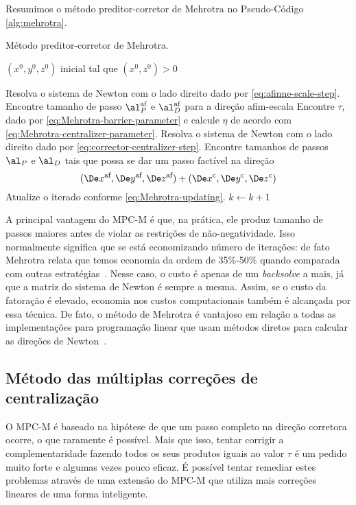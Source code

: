  Resumimos o método preditor-corretor de Mehrotra no Pseudo-Código
 \ref{alg:mehrotra}.
 \begin{algorithm}
\caption{Método preditor-corretor de Mehrotra.}
\label{alg:mehrotra}
\begin{algorithmic}[0] 
\Require $(x^0,y^0,z^0)$ inicial tal que $(x^0,z^0) > 0$ 

	\Repeat
		\State Resolva o sistema de Newton com o lado direito dado por
		\eqref{eq:afinne-scale-step}. 
		 \State Encontre tamanho de passo $\al_P^{\text{af}}$ e $\al_D^{\text{af}}$
		 para a direção afim-escala \State Encontre $\tau$, dado por \eqref{eq:Mehrotra-barrier-parameter} e
		 calcule $\eta$ de acordo com \eqref{eq:Mehrotra-centralizer-parameter}.
		 \State Resolva o sistema de Newton com o lado direito dado por
		  \eqref{eq:corrector-centralizer-step}.
		  \State Encontre tamanhos de passos $\al_P$ e $\al_D$  tais que possa se dar
		  um passo factível na direção  \[(\dex, \dey, \dez) +  (\Decox, \Decoy,
		  \Decoz)\] 
		  \State Atualize o iterado conforme 
		  \eqref{eq:Mehrotra-updating}.
		   \State $k\gets k+1$

\end{algorithmic}
\end{algorithm}
 
 
 A principal vantagem do \ac{MPC-M} é que, na prática, ele produz tamanho de
 passos maiores antes de violar as restrições de não-negatividade. Isso normalmente
 significa que se está economizando número de iterações: de fato Mehrotra relata
 que temos economia da ordem de 35\%-50\% quando comparada com outras
 estratégias~\cite{Mehrotra:1992wr}. Nesse
 caso, o custo é apenas de um \emph{backsolve} a mais, já que a matriz do
 sistema de Newton é sempre a mesma. Assim, se o custo da fatoração é elevado,
 economia nos custos computacionais também é alcançada por essa técnica. De 
 fato, o método de Mehrotra é vantajoso em relação a todas as implementações
 para programação linear que usam métodos diretos para calcular as direções de
 Newton~\cite[pg. 40]{Colombo:2008wm}.
 
 
 \subsection{Método das múltiplas correções de centralização}
 
O \acl{MPC-M} é baseado na hipótese de que um passo
completo na direção corretora ocorre, o que raramente é possível. Mais que
isso,  tentar corrigir a complementaridade fazendo todos os seus produtos
iguais ao valor $\tau$ é um pedido muito forte e algumas vezes pouco eficaz. 
É possível tentar remediar estes problemas através de uma extensão do \ac{MPC-M}
que utiliza mais correções lineares de uma forma inteligente.

